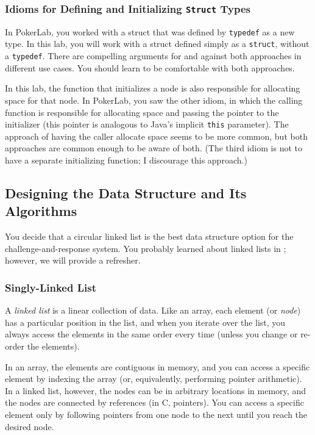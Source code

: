 \subsubsection{Idioms for Defining and Initializing \texttt{Struct} Types}

In PokerLab, you worked with a struct that was defined by \lstinline{typedef} as a new type.
In this lab, you will work with a struct defined simply as a \lstinline{struct}, without a \lstinline{typedef}.
There are compelling arguments for and against both approaches in different use cases.
You should learn to be comfortable with both approaches.

In this lab, the function that initializes a node is also responsible for allocating space for that node.
In PokerLab, you saw the other idiom, in which the calling function is responsible for allocating space and passing the pointer to the initializer (this pointer is analogous to Java's implicit \lstinline{this} parameter).
The approach of having the caller allocate space seems to be more common, but both approaches are common enough to be aware of both.
(The third idiom is not to have a separate initializing function;
I discourage this approach.)

\subsection{Designing the Data Structure and Its Algorithms}

You decide that a circular linked list is the best data structure option for the challenge-and-response system.
You probably learned about linked lists in \cstwo; however, we will provide a refresher.

\subsubsection{Singly-Linked List} \label{subsubsec:singlylinkedlist}

A \textit{linked list} is a linear collection of data.
Like an array, each element (or \textit{node}) has a particular position in the list, and when you iterate over the list, you always access the elements in the same order every time (unless you change or re-order the elements).

In an array, the elements are contiguous in memory, and you can access a specific element by indexing the array (or, equivalently, performing pointer arithmetic).
In a linked list, however, the nodes can be in arbitrary locations in memory, and the nodes are connected by references (in C, pointers).
You can access a specific element only by following pointers from one node to the next until you reach the desired node.

